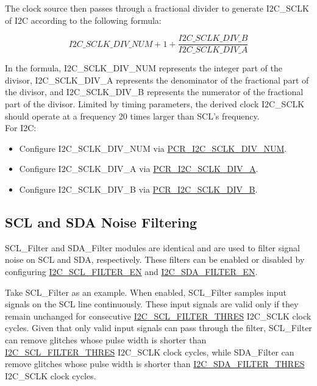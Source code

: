 \documentclass[main\_\_EN.tex]{subfiles}
\begin{document}
The clock source then passes through a fractional divider to generate I2C\_SCLK of I2C according to the following formula:

\begin{equation*}
I2C\_SCLK\_DIV\_NUM + 1+\frac{ I2C\_SCLK\_DIV\_B}{I2C\_SCLK\_DIV\_A}
\end{equation*}

In the formula, I2C\_SCLK\_DIV\_NUM represents the integer part of the divisor, I2C\_SCLK\_DIV\_A represents the denominator of the fractional part of the divisor, and I2C\_SCLK\_DIV\_B represents the numerator of the fractional part of the divisor. Limited by timing parameters, the derived clock I2C\_SCLK should operate at a frequency 20 times larger than SCL's frequency.\\

For I2C:

\begin{itemize}
    \item Configure I2C\_SCLK\_DIV\_NUM via \hyperref[fielddesc:PCRI2CSCLKDIVNUM]{PCR\_I2C\_SCLK\_DIV\_NUM}.
    \item Configure I2C\_SCLK\_DIV\_A via \hyperref[fielddesc:PCRI2CSCLKDIVA]{PCR\_I2C\_SCLK\_DIV\_A}.
    \item Configure I2C\_SCLK\_DIV\_B via \hyperref[fielddesc:PCRI2CSCLKDIVB]{PCR\_I2C\_SCLK\_DIV\_B}.
\end{itemize}

\subsection{SCL and SDA Noise Filtering}

SCL\_Filter and SDA\_Filter modules are identical and are used to filter signal noise on SCL and SDA, respectively. These filters can be enabled or disabled by configuring \hyperref[fielddesc:I2CSCLFILTEREN]{I2C\_SCL\_FILTER\_EN} and \hyperref[fielddesc:I2CSDAFILTEREN]{I2C\_SDA\_FILTER\_EN}.

Take SCL\_Filter as an example. When enabled, SCL\_Filter samples input signals on the SCL line continuously. These input signals are valid only if they remain unchanged for consecutive \hyperref[fielddesc:I2CSCLFILTERTHRES]{I2C\_SCL\_FILTER\_THRES} I2C\_SCLK clock cycles. Given that only valid input signals can pass through the filter, SCL\_Filter can remove glitches whose pulse width is shorter than \hyperref[fielddesc:I2CSCLFILTERTHRES]{I2C\_SCL\_FILTER\_THRES} I2C\_SCLK clock cycles, while SDA\_Filter can remove glitches whose pulse width is shorter than \hyperref[fielddesc:I2CSDAFILTERTHRES]{I2C\_SDA\_FILTER\_THRES} I2C\_SCLK clock cycles.
\end{document}
